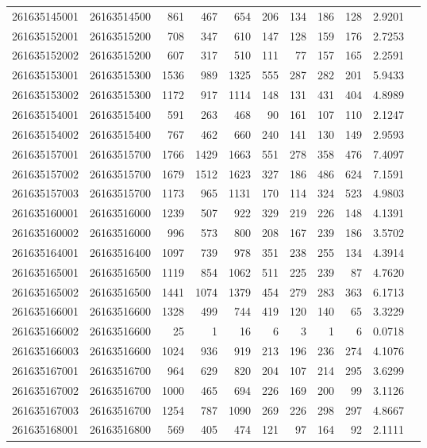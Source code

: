 \documentclass[11pt,landscape]{article}
\begin{document}
{\begin{longtable}[]{@{}lrrrrrrrrrr@{}}
261635145001 & 26163514500 & 861 & 467 & 654 & 206 & 134 & 186 & 128 & 2.9201 \\
261635152001 & 26163515200 & 708 & 347 & 610 & 147 & 128 & 159 & 176 & 2.7253 \\
261635152002 & 26163515200 & 607 & 317 & 510 & 111 & 77 & 157 & 165 & 2.2591 \\
261635153001 & 26163515300 & 1536 & 989 & 1325 & 555 & 287 & 282 & 201 & 5.9433 \\
261635153002 & 26163515300 & 1172 & 917 & 1114 & 148 & 131 & 431 & 404 & 4.8989 \\
261635154001 & 26163515400 & 591 & 263 & 468 & 90 & 161 & 107 & 110 & 2.1247 \\
261635154002 & 26163515400 & 767 & 462 & 660 & 240 & 141 & 130 & 149 & 2.9593 \\
261635157001 & 26163515700 & 1766 & 1429 & 1663 & 551 & 278 & 358 & 476 & 7.4097 \\
261635157002 & 26163515700 & 1679 & 1512 & 1623 & 327 & 186 & 486 & 624 & 7.1591 \\
261635157003 & 26163515700 & 1173 & 965 & 1131 & 170 & 114 & 324 & 523 & 4.9803 \\
261635160001 & 26163516000 & 1239 & 507 & 922 & 329 & 219 & 226 & 148 & 4.1391 \\
261635160002 & 26163516000 & 996 & 573 & 800 & 208 & 167 & 239 & 186 & 3.5702 \\
261635164001 & 26163516400 & 1097 & 739 & 978 & 351 & 238 & 255 & 134 & 4.3914 \\
261635165001 & 26163516500 & 1119 & 854 & 1062 & 511 & 225 & 239 & 87 & 4.7620 \\
261635165002 & 26163516500 & 1441 & 1074 & 1379 & 454 & 279 & 283 & 363 & 6.1713 \\
261635166001 & 26163516600 & 1328 & 499 & 744 & 419 & 120 & 140 & 65 & 3.3229 \\
261635166002 & 26163516600 & 25 & 1 & 16 & 6 & 3 & 1 & 6 & 0.0718 \\
261635166003 & 26163516600 & 1024 & 936 & 919 & 213 & 196 & 236 & 274 & 4.1076 \\
261635167001 & 26163516700 & 964 & 629 & 820 & 204 & 107 & 214 & 295 & 3.6299 \\
261635167002 & 26163516700 & 1000 & 465 & 694 & 226 & 169 & 200 & 99 & 3.1126 \\
261635167003 & 26163516700 & 1254 & 787 & 1090 & 269 & 226 & 298 & 297 & 4.8667 \\
261635168001 & 26163516800 & 569 & 405 & 474 & 121 & 97 & 164 & 92 & 2.1111 \\

\end{longtable}}
\end{document}
